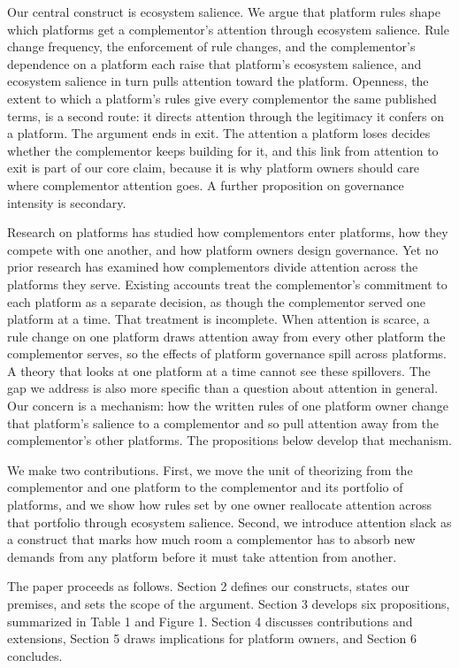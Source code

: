 \documentclass[12pt]{article}
\begin{document}
Our central construct is ecosystem salience. We argue that platform rules shape which platforms get a complementor's attention through ecosystem salience. Rule change frequency, the enforcement of rule changes, and the complementor's dependence on a platform each raise that platform's ecosystem salience, and ecosystem salience in turn pulls attention toward the platform. Openness, the extent to which a platform's rules give every complementor the same published terms, is a second route: it directs attention through the legitimacy it confers on a platform. The argument ends in exit. The attention a platform loses decides whether the complementor keeps building for it, and this link from attention to exit is part of our core claim, because it is why platform owners should care where complementor attention goes. A further proposition on governance intensity is secondary.

Research on platforms has studied how complementors enter platforms, how they compete with one another, and how platform owners design governance. Yet no prior research has examined how complementors divide attention across the platforms they serve. Existing accounts treat the complementor's commitment to each platform as a separate decision, as though the complementor served one platform at a time. That treatment is incomplete. When attention is scarce, a rule change on one platform draws attention away from every other platform the complementor serves, so the effects of platform governance spill across platforms. A theory that looks at one platform at a time cannot see these spillovers. The gap we address is also more specific than a question about attention in general. Our concern is a mechanism: how the written rules of one platform owner change that platform's salience to a complementor and so pull attention away from the complementor's other platforms. The propositions below develop that mechanism.

We make two contributions. First, we move the unit of theorizing from the complementor and one platform to the complementor and its portfolio of platforms, and we show how rules set by one owner reallocate attention across that portfolio through ecosystem salience. Second, we introduce attention slack as a construct that marks how much room a complementor has to absorb new demands from any platform before it must take attention from another.

The paper proceeds as follows. Section 2 defines our constructs, states our premises, and sets the scope of the argument. Section 3 develops six propositions, summarized in Table 1 and Figure 1. Section 4 discusses contributions and extensions, Section 5 draws implications for platform owners, and Section 6 concludes.
\end{document}
